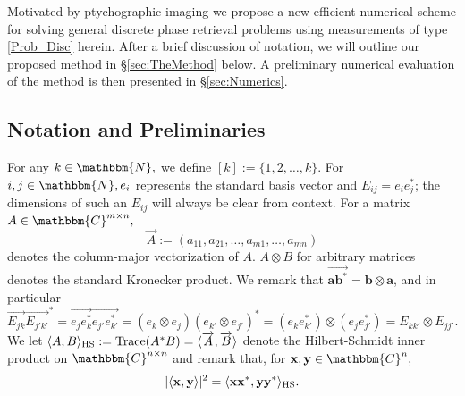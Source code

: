 \documentclass[]{spie}  %
\def \vec{\overrightarrow}
\def \a {\mathbf a}
\def \b {\mathbf b}
\def \bar {\overline}
\def \x {\mathbf x}
\def \y {\mathbf y}
\def \C {\mathbbm{C}}
\def \N {\mathbbm{N}}
\def \HS {\rm HS}
\DeclareMathOperator{\Tr}{\rm Trace}
\begin{document}
Motivated by ptychographic imaging we propose a new efficient numerical scheme for solving general discrete phase retrieval problems using measurements of type \eqref{Prob_Disc} herein. After a brief discussion of notation, we will outline our proposed method in \S\ref{sec:TheMethod} below.  A preliminary numerical evaluation of the method is then presented in \S\ref{sec:Numerics}.

\subsection*{Notation and Preliminaries}

 For any $k \in \N,$ we define $[k] := \{1, 2, \ldots, k\}$.  For $i, j \in \N, e_i$ represents the standard basis vector and $E_{ij} = e_i e_j^*$; the dimensions of such an $E_{ij}$ will always be clear from context.  For a matrix $A \in \C^{m \times n},$ $$\vec{A} := (a_{11}, a_{21}, \ldots, a_{m1}, \ldots, a_{mn})$$ denotes the column-major vectorization of $A$.  $A \otimes B$ for arbitrary matrices denotes the standard Kronecker product.  We remark that $\vec{\a\b^*} = \bar{\b} \otimes \a$, and in particular%
\begin{equation}
  \vec{E_{jk}} \vec{E_{j'k'}}^* = \vec{e_j e_k^*} \vec{e_{j'} e_{k'}^*} = (e_k \otimes e_j) (e_{k'} \otimes e_{j'})^* = (e_k e_{k'}^*) \otimes (e_j e_{j'}^*) = E_{kk'} \otimes E_{jj'}.
  \label{id:kronsimp}
\end{equation} We let $\langle A, B \rangle_{\HS} := \Tr(A^* B) = \langle \vec{A}, \vec{B} \rangle$ denote the Hilbert-Schmidt inner product on $\C^{n \times n}$ and remark that, for $\x, \y \in \C^n,$ %
  \begin{equation}%
    |\langle \x, \y \rangle |^2 = \langle \x \x^*, \y \y^* \rangle_{\HS}.%
    \label{id:quadprod}%
  \end{equation}%
\end{document}
